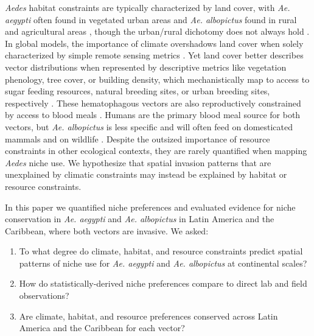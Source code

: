 \textit{Aedes} habitat constraints are typically characterized by land cover, with \textit{Ae. aegypti} often found in vegetated urban areas \cite{Troyo2009-yv, Jansen2010-uj} and \textit{Ae. albopictus} found in rural and agricultural areas \cite{Knudsen1995-pc, Tsuda2006-gl}, though the urban/rural dichotomy does not always hold \cite{Li2014-fq}. In global models, the importance of climate overshadows land cover when solely characterized by simple remote sensing metrics \cite{Kraemer2015-ct, Carlson2016-rc}. Yet land cover better describes vector distributions when represented by descriptive metrics like vegetation phenology, tree cover, or building density, which mechanistically map to access to sugar feeding resources, natural breeding sites, or urban breeding sites, respectively \cite{Martinez-Ibarra1997-ra, Peterson2005-ml, Vanwambeke2007-pw, Troyo2009-yv, Landau2012-dn, Li2014-fq}. These hematophagous vectors are also reproductively constrained by access to blood meals \cite{Padmanabha2012-xa}. Humans are the primary blood meal source for both vectors, but \textit{Ae. albopictus} is less specific and will often feed on domesticated mammals and on wildlife \cite{Gratz2004-xn, Delatte2008-hc}. Despite the outsized importance of resource constraints in other ecological contexts, they are rarely quantified when mapping \textit{Aedes} niche use. We hypothesize that spatial invasion patterns that are unexplained by climatic constraints may instead be explained by habitat or resource constraints.

In this paper we quantified niche preferences and evaluated evidence for niche conservation in \textit{Ae. aegypti} and \textit{Ae. albopictus} in Latin America and the Caribbean, where both vectors are invasive. We asked:

\begin{enumerate}
    \item To what degree do climate, habitat, and resource constraints predict spatial patterns of niche use for \textit{Ae. aegypti} and \textit{Ae. albopictus} at continental scales? 
    \item How do statistically-derived niche preferences compare to direct lab and field observations?
    \item Are climate, habitat, and resource preferences conserved across Latin America and the Caribbean for each vector?
\end{enumerate}

